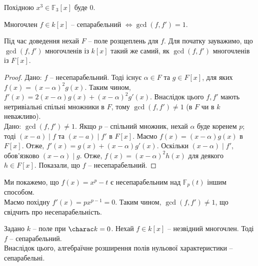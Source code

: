 \documentclass{math_library}
\begin{document}
\begin{example}
Похідною $x^3 \in \mathbb{F}_3[x]$ буде $0$.
\end{example}

\begin{proposition}
Многочлен $f \in k[x]$ -- сепарабельний $\iff \gcd(f,f') = 1$.
\end{proposition}

\begin{remark}
Під час доведення нехай $F$ -- поле розщеплень для $f$. Для початку зауважимо, що $\gcd(f,f')$ многочленів із $k[x]$ такий же самий, як $\gcd(f,f')$ многочленів із $F[x]$.
\end{remark}

\begin{proof}
\leftproof Дано: $f$ -- несепарабельний. Тоді існує $\alpha \in F$ та $g \in F[x]$, для яких $f(x) = (x-\alpha)^2 g(x)$. Таким чином, $f'(x) = 2(x-\alpha)g(x) + (x-\alpha)^2 g'(x)$. Внаслідок цього $f,f'$ мають нетривіальні спільні множники в $F$, тому $\gcd(f,f') \neq 1$ (в $F$ чи в $k$ неважливо).
\bigskip \\
\rightproof Дано: $\gcd(f,f') \neq 1$. Якщо $p$ -- спільний множник, нехай $\alpha$ буде коренем $p$; тоді $(x-a) \mid f$ та $(x-a) \mid f'$ в $F[x]$. Маємо $f(x) = (x-\alpha)g(x)$ в $F[x]$. Отже, $f'(x) = g(x) + (x-\alpha)g'(x)$. Оскільки $(x-\alpha) \mid f'$, обов'язково $(x-\alpha) \mid g$. Отже, $f(x) = (x-\alpha)^2 h(x)$ для деякого $h \in F[x]$. Показали, що $f$ -- несепарабельний.
\end{proof}

\begin{example}
Ми покажемо, що $f(x) = x^p - t$ є несепарабельним над $\mathbb{F}_p(t)$ іншим способом.\\
Маємо похідну $f'(x) = p x^{p-1} = 0$. Таким чином, $\gcd(f,f') \neq 1$, що свідчить про несепарабельність.
\end{example}

\begin{proposition}
\label{irreducible_is_separable_on_zero_characteristic}
Задано $k$ -- поле при $\charac k = 0$. Нехай $f \in k[x]$ -- незвідний многочлен. Тоді $f$ -- сепарабельний. \\
Внаслідок цього, алгебраїчне розширення полів нульової характеристики -- сепарабельні.
\end{proposition}
\end{document}
